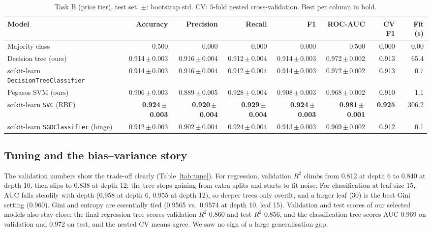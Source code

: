 \documentclass[10pt,twocolumn,a4paper]{article}
\newcommand{\pmstd}[2]{#1\,{\scriptsize$\pm$\,#2}}
\begin{document}
\begin{table}[t]
  \centering\small
  \caption{Task B (price tier), test set. $\pm$: bootstrap std. CV: 5-fold nested cross-validation. Best per column in bold.}
  \label{tab:resB}
  \begin{tabular}{@{}lrrrrrrr@{}}
    \toprule
    Model & Accuracy & Precision & Recall & F1 & ROC-AUC & CV F1 & Fit (s)\\
    \midrule
    Majority class                & 0.500 & 0.000 & 0.000 & 0.000 & 0.500 & 0.000 & 0.00\\
    Decision tree (ours)          & \pmstd{0.914}{0.003} & \pmstd{0.916}{0.004} & \pmstd{0.912}{0.004} & \pmstd{0.914}{0.003} & \pmstd{0.972}{0.002} & 0.913 & 65.4\\
    scikit-learn \texttt{DecisionTreeClassifier} & \pmstd{0.914}{0.003} & \pmstd{0.916}{0.004} & \pmstd{0.912}{0.004} & \pmstd{0.914}{0.003} & \pmstd{0.972}{0.002} & 0.913 & 0.7\\
    Pegasos SVM (ours)            & \pmstd{0.906}{0.003} & \pmstd{0.889}{0.005} & \pmstd{0.928}{0.004} & \pmstd{0.908}{0.003} & \pmstd{0.968}{0.002} & 0.910 & 1.1\\
    scikit-learn \texttt{SVC} (RBF) & \textbf{\pmstd{0.924}{0.003}} & \textbf{\pmstd{0.920}{0.004}} & \textbf{\pmstd{0.929}{0.004}} & \textbf{\pmstd{0.924}{0.003}} & \textbf{\pmstd{0.981}{0.001}} & \textbf{0.925} & 306.2\\
    scikit-learn \texttt{SGDClassifier} (hinge) & \pmstd{0.912}{0.003} & \pmstd{0.902}{0.004} & \pmstd{0.924}{0.004} & \pmstd{0.913}{0.003} & \pmstd{0.969}{0.002} & 0.912 & 0.1\\
    \bottomrule
  \end{tabular}
\end{table}

\subsection{Tuning and the bias--variance story}
The validation numbers show the trade-off clearly (Table~\ref{tab:tune}). For
regression, validation $R^2$ climbs from 0.812 at depth 6 to 0.840 at depth
10, then slips to 0.838 at depth 12: the tree stops gaining from extra splits and starts
to fit noise. For classification at leaf size 15, AUC falls steadily with depth
(0.958 at depth 6, 0.955 at depth 12), so deeper trees only overfit, and a larger
leaf (30) is the best Gini setting (0.960). Gini and entropy are essentially
tied (0.9565 vs.\ 0.9574 at depth 10, leaf 15). Validation and test scores of our
selected models also stay close: the final regression tree scores validation $R^2$
0.860 and test $R^2$ 0.856, and the classification tree scores AUC 0.969 on validation and 0.972 on test,
and the nested CV means agree. We saw no sign of a large generalisation gap.
\end{document}
